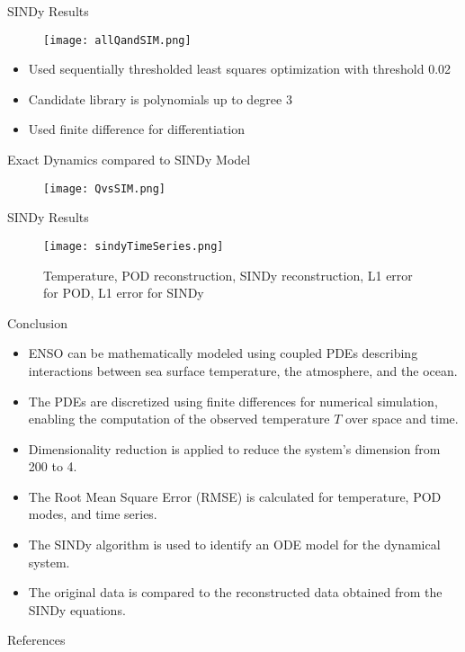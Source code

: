 \documentclass[9pt,xcolor=dvipsnames]{beamer}
\begin{document}
\begin{frame}{SINDy Results}
\begin{figure}
    \texttt{[image: allQandSIM.png]}
    \hspace{1pt}
\end{figure}
\begin{itemize}
    \item Used sequentially thresholded least squares optimization with threshold 0.02
    \item Candidate library is polynomials up to degree 3
    \item Used finite difference for differentiation
\end{itemize}
\end{frame}

\begin{frame}{Exact Dynamics compared to SINDy Model}
\begin{figure} 
        \centering
        \texttt{[image: QvsSIM.png]} \hspace{1pt}
\end{figure}
\end{frame}

\begin{frame}{SINDy Results}
\begin{figure} 
        \centering
        \texttt{[image: sindyTimeSeries.png]} 
        \caption{Temperature, POD reconstruction, SINDy reconstruction, L1 error for POD, L1 error for SINDy}
\end{figure}
\end{frame}

\begin{frame}{Conclusion}
    \begin{itemize}
        \item ENSO can be mathematically modeled using coupled PDEs describing interactions between sea surface temperature, the atmosphere, and the ocean.
        \item The PDEs are discretized using finite differences for numerical simulation, enabling the computation of the observed temperature $T$ over space and time.
        \item Dimensionality reduction is applied to reduce the system's dimension from 200 to 4.
        \item The Root Mean Square Error (RMSE) is calculated for temperature, POD modes, and time series.
        \item The SINDy algorithm is used to identify an ODE model for the dynamical system.
        \item The original data is compared to the reconstructed data obtained from the SINDy equations.
    \end{itemize}
\end{frame}
\begin{frame}{References}
    
    \nocite{*}
    
\end{frame}
\end{document}

